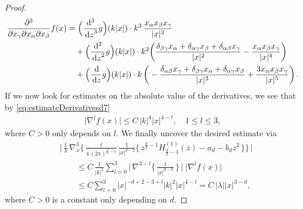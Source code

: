 \begin{proof}
\begin{align*}
  \frac{\partial^3}{\partial x_\gamma \partial x_\alpha \partial x_\beta} f(x)
  &= \Big(\frac{\mathrm{d}^3}{\, {\operatorname{d}\!{z}}^3}g\Big)(k |x|) \cdot k^3 \,\frac{x_\alpha x_\beta x_\gamma}{|x|^3} \\
  &\quad + \Big(\frac{\mathrm{d}^2}{\, {\operatorname{d}\!{z}}^2}g\Big)(k|x|) 
  \cdot k^2 \bigg( \frac{\delta_{\beta\gamma} x_\alpha + \delta_{\alpha\gamma} x_\beta + \delta_{\alpha\beta} x_\gamma }{|x|^2} 
  - \frac{x_\alpha x_\beta x_\gamma}{|x|^4} \bigg) \\
  &\quad + \Big(\frac{\, {\operatorname{d}\!{}}}{\, {\operatorname{d}\!{z}}}g\Big)(k|x|) \cdot k\, \bigg(-\frac{ \delta_{\alpha\beta}x_\gamma + \delta_{\beta\gamma}x_\alpha  + \delta_{\alpha\gamma}x_\beta }{|x|^3} + \frac{3 x_\alpha x_\beta x_\gamma}{|x|^5} \bigg)\,.
\end{align*}
If we now look for estimates on the absolute value of the derivatives, we see that by \eqref{eq:estimateDerivativesd7}
\begin{align*}
  \big|\nabla^l f(x)\big| \leq C \, |k|^4 |x|^{4 - l}, \quad 1 \leq l \leq 3,
\end{align*}
where $C > 0$ only depends on $l$.
We finally uncover the desired estimate via
\begin{align*}
  &\bigg|\, 
  \frac{1}{\lambda} \, \nabla_x^3
  \Bigg\{ \, \frac{\ii}{4\, (2\pi)^{\frac{d}{2} - 1}}\, \frac{1}{|x|^{d - 2}} 
  \Big\{ \,z^{\frac{d}{2} - 1} H_{\frac{d}{2} - 1}^{(1)}(z) - a_d - b_d z^2 \,
  \Big\} 
  \Bigg\} \,
  \bigg| \\[0.5em]
  &\qquad\leq C\, 
  \frac{1}{|k|^2} \sum_{l = 0}^3 \bigg| \, \nabla^{3 - l} \bigg\{\, \frac{1}{|x|^{d - 2}}\, \bigg\} \, \bigg|
  \; \big| \nabla^l f(x) \big| \\[0.5em]
  &\qquad\leq C \sum_{l = 0}^3 |x|^{-d + 2 - 3 + l} |k|^2 |x|^{4 - l} = C\, |\lambda| |x|^{3 - d},
\end{align*}
where $C > 0$ is a constant only depending on $d$.


\end{proof}
